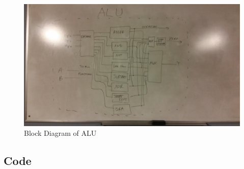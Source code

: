 \documentclass[12pt]{article}
\begin{document}
\begin{figure}[H]
\centering
\includegraphics[width=1\linewidth]{block-dia}
\caption{Block Diagram of ALU}
\label{fig:block-dia}
\end{figure}

\subsection{Code}\label{sec:code}
\lstset{language=VHDL}

\begin{lstlisting}

\end{lstlisting}
\end{document}
